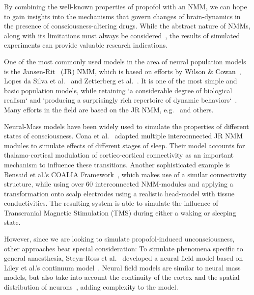 
By combining the well-known properties of propofol with an NMM, we can hope to gain insights into the mechanisms that
govern changes of brain-dynamics in the presence of consciousness-altering drugs.
While the abstract nature of NMMs, along with its limitations must always be
considered~\cite{deschle_validity_2021},
the results of simulated experiments can provide valuable research indications.


One of the most commonly used models in the area of neural population models is the
Jansen-Rit~\cite{jansen_electroencephalogram_1995} (JR) NMM,
which is based on efforts by Wilson \& Cowan~\cite{wilson_excitatory_1972},
Lopes da Silva et al.~\cite{lopes_da_silva_model_1974, lopes_da_silva_models_1976} and
Zetterberg et al.~\cite{zetterberg_performance_1978}.
It is one of the most simple and basic population models,
while retaining `a considerable degree of biological realism` and
`producing a surprisingly rich repertoire of dynamic behaviors`~\cite{knösche_jansen-rit_2014}.
Many efforts in the field are based on the JR NMM, e.g.~\cite{wendling_relevance_2000, david_neural_2003,
    moran_dynamic_2009, spiegler_bifurcation_2010, cona_thalamo-cortical_2014, bensaid_coalia_2019} and others.



Neural-Mass models have been widely used to simulate the properties of different states of consciousness.
Cona et al.~\cite{cona_thalamo-cortical_2014} adapted multiple interconnected JR NMM modules to simulate effects
of different stages of sleep.
Their model accounts for thalamo-cortical modulation of cortico-cortical connectivity as an important mechanism to
influence these transitions.
Another sophisticated example is Bensaid et al.'s COALIA Framework~\cite{wendling_epileptic_2002, bensaid_coalia_2019},
which makes use of a similar connectivity structure, while using over 60 interconnected NMM-modules and applying a
transformation onto scalp electrodes using a realistic head-model with tissue conductivities.
The resulting system is able to simulate the influence of Transcranial Magnetic Stimulation (TMS) during either
a waking or sleeping state.

However, since we are looking to simulate propofol-induced unconsciousness, other approaches bear special
consideration:
To simulate phenomena specific to general anaesthesia,
Steyn-Ross et al.~\cite{steyn_ross_modelling_2004, hutt_progress_2011} developed a neural field model based
on Liley et al.'s continuum model~\cite{liley_continuum_1999}.
Neural field models are similar to neural mass models,
but also take into account the continuity of the cortex and the spatial distribution of
neurons~\cite{glomb_computational_2022}, adding complexity to the model.


